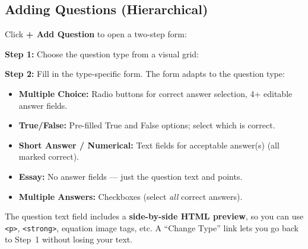 \documentclass[12pt,letterpaper]{article}
\begin{document}
\subsection{Adding Questions (Hierarchical)}

Click \textbf{+ Add Question} to open a two-step form:

\textbf{Step 1:} Choose the question type from a visual grid:

\begin{center}
\end{center}

\textbf{Step 2:} Fill in the type-specific form. The form adapts to the question type:
\begin{itemize}[leftmargin=*]
    \item \textbf{Multiple Choice:} Radio buttons for correct answer selection, 4+ editable answer fields.
    \item \textbf{True/False:} Pre-filled True and False options; select which is correct.
    \item \textbf{Short Answer / Numerical:} Text fields for acceptable answer(s) (all marked correct).
    \item \textbf{Essay:} No answer fields --- just the question text and points.
    \item \textbf{Multiple Answers:} Checkboxes (select \emph{all} correct answers).
\end{itemize}

The question text field includes a \textbf{side-by-side HTML preview}, so you can use \texttt{<p>}, \texttt{<strong>}, equation image tags, etc. A ``Change Type'' link lets you go back to Step~1 without losing your text.
\end{document}
